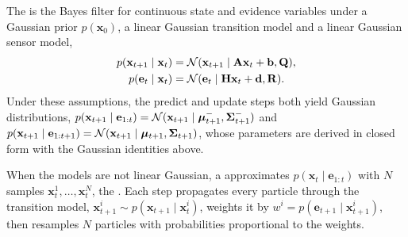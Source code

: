 \documentclass[11pt, a4paper]{exam}
\begin{document}
\begin{recap}
    The  is the Bayes filter for continuous state and evidence variables under a Gaussian prior $p(\mathbf{x}_0)$, a linear Gaussian transition model and a linear Gaussian sensor model,
    \begin{align*}
        p(\mathbf{x}_{t+1} \mid \mathbf{x}_t) & = \mathcal{N}(\mathbf{x}_{t+1} \mid \mathbf{A} \mathbf{x}_t + \mathbf{b}, \mathbf{Q}), \\
        p(\mathbf{e}_t \mid \mathbf{x}_t) & = \mathcal{N}(\mathbf{e}_t \mid \mathbf{H} \mathbf{x}_t + \mathbf{d}, \mathbf{R}).
    \end{align*}
    Under these assumptions, the predict and update steps both yield Gaussian distributions, $p(\mathbf{x}_{t+1} \mid \mathbf{e}_{1:t}) = \mathcal{N}(\mathbf{x}_{t+1} \mid \bm{\mu}_{t+1}^-, \bm{\Sigma}_{t+1}^-)$ and $p(\mathbf{x}_{t+1} \mid \mathbf{e}_{1:t+1}) = \mathcal{N}(\mathbf{x}_{t+1} \mid \bm{\mu}_{t+1}, \bm{\Sigma}_{t+1})$, whose parameters are derived in closed form with the Gaussian identities above.

    When the models are not linear Gaussian, a  approximates $p(\mathbf{x}_t \mid \mathbf{e}_{1:t})$ with $N$ samples $\mathbf{x}_t^1, \ldots, \mathbf{x}_t^N$, the . Each step propagates every particle through the transition model, $\mathbf{x}_{t+1}^i \sim p(\mathbf{x}_{t+1} \mid \mathbf{x}_t^i)$, weights it by $w^i = p(\mathbf{e}_{t+1} \mid \mathbf{x}_{t+1}^i)$, then resamples $N$ particles with probabilities proportional to the weights.
\end{recap}
\end{document}
